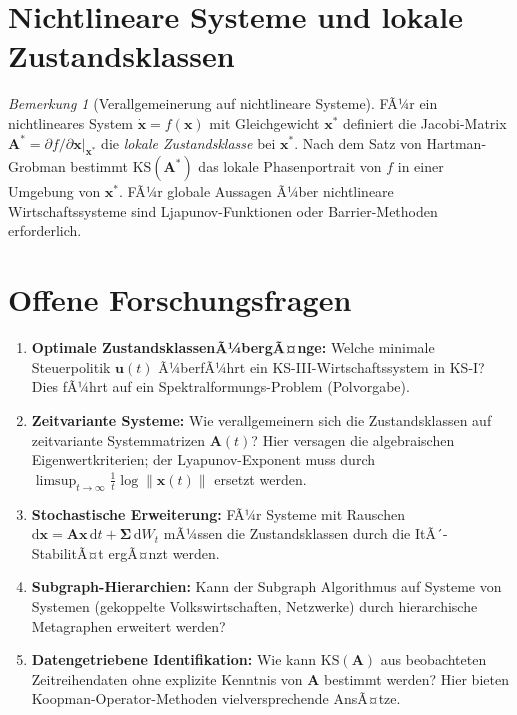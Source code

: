﻿\documentclass[12pt, a4paper, titlepage]{report}
\theoremstyle{definition}
\theoremstyle{remark}
\newtheorem{remark}[theorem]{Bemerkung}
\newcommand{\vx}{\bm{x}}
\newcommand{\vu}{\bm{u}}
\newcommand{\vA}{\bm{A}}
\newcommand{\KS}{\mathrm{KS}}
\begin{document}
\section{Nichtlineare Systeme und lokale Zustandsklassen}

\begin{remark}[Verallgemeinerung auf nichtlineare Systeme]
FÃ¼r ein nichtlineares System $\dot{\vx} = f(\vx)$ mit Gleichgewicht $\vx^*$ definiert
die Jacobi-Matrix $\vA^* = \partial f/\partial\vx\big|_{\vx^*}$ die
\emph{lokale Zustandsklasse} bei $\vx^*$. Nach dem Satz von Hartman-Grobman
bestimmt $\KS(\vA^*)$ das lokale Phasenportrait von $f$ in einer Umgebung von $\vx^*$.
FÃ¼r globale Aussagen Ã¼ber nichtlineare Wirtschaftssysteme sind Ljapunov-Funktionen
oder Barrier-Methoden erforderlich.
\end{remark}

\section{Offene Forschungsfragen}

\begin{enumerate}[label=\textbf{F\arabic*.}]
  \item \textbf{Optimale ZustandsklassenÃ¼bergÃ¤nge:} Welche minimale Steuerpolitik
    $\vu(t)$ Ã¼berfÃ¼hrt ein KS-III-Wirtschaftssystem in KS-I? Dies fÃ¼hrt auf ein
    Spektralformungs-Problem (Polvorgabe).

  \item \textbf{Zeitvariante Systeme:} Wie verallgemeinern sich die Zustandsklassen auf
    zeitvariante Systemmatrizen $\vA(t)$? Hier versagen die algebraischen Eigenwertkriterien;
    der Lyapunov-Exponent muss durch $\limsup_{t\to\infty} \frac{1}{t}\log\|\vx(t)\|$ ersetzt werden.

  \item \textbf{Stochastische Erweiterung:} FÃ¼r Systeme mit Rauschen
    $\mathrm{d}\vx = \vA\vx\,\mathrm{d}t + \bm{\Sigma}\,\mathrm{d}W_t$ mÃ¼ssen
    die Zustandsklassen durch die ItÃ´-StabilitÃ¤t ergÃ¤nzt werden.

  \item \textbf{Subgraph-Hierarchien:} Kann der Subgraph Algorithmus auf Systeme von
    Systemen (gekoppelte Volkswirtschaften, Netzwerke) durch hierarchische Metagraphen
    erweitert werden?

  \item \textbf{Datengetriebene Identifikation:} Wie kann $\KS(\vA)$ aus beobachteten
    Zeitreihendaten ohne explizite Kenntnis von $\vA$ bestimmt werden? Hier bieten
    Koopman-Operator-Methoden vielversprechende AnsÃ¤tze.
\end{enumerate}
\end{document}
